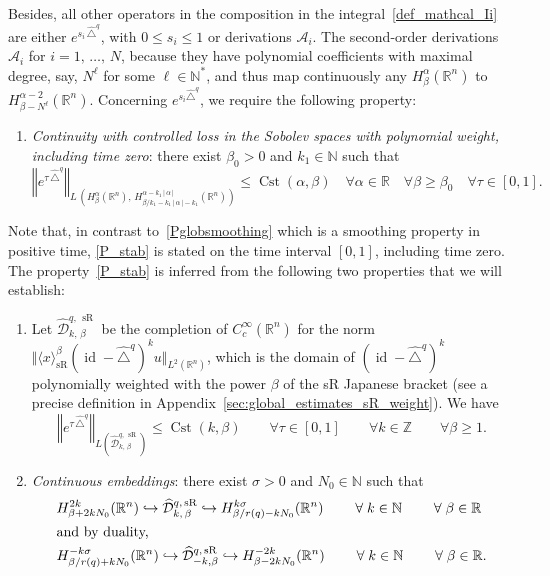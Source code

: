 \documentclass[10pt]{amsart}
\theoremstyle{definition}\newtheorem{defi}[theo]{Definition}\newtheorem{rema}[theo]{Remark}\newtheorem{exam}[theo]{Example}\newtheorem{exem}[theo]{Example}\newtheorem{nota}[theo]{Notation}
\newcommand*\R{\mathbb{R}}
\newcommand*\N{\mathbb{N}}
\newcommand*\Z{\mathbb{Z}}
\newcommand{\calA}{\mathcal{A}}
\newcommand{\calD}{\mathcal{D}}
\DeclareMathOperator{\Cst}{Cst}
\DeclareMathOperator{\id}{id}
\DeclareMathOperator{\sR}{sR}
\renewcommand{\geq}{\geqslant}
\renewcommand{\leq}{\leqslant}
\newcommand*{\Penumi}{\renewcommand*{\theenumi}{$\mathbf{P}_\arabic{enumi}$}}
\let\oldforall\forall
\renewcommand*{\forall}{\mathrel{\oldforall}}
\begin{document}
Besides, all other operators in the composition in the integral~\eqref{def_mathcal_Ii} are either $e^{s_i\,\widehat{\triangle}^{q}}$, with $0\leq s_i\leq 1$ or derivations $\calA_i$. The second-order derivations $\calA_i$ for $i=1,\,\ldots,\,N$, because they have polynomial coefficients with maximal degree, say, $N^\ell$ for some $\ell\in\N^*$, and thus map continuously any $H^\alpha_\beta(\R^n)$ to $H^{\alpha-2}_{\beta-N^\ell}(\R^n)$. Concerning $e^{s_i \widehat{\triangle}^{q}}$, we require the following property:
\begin{enumerate}\Penumi
\setcounter{enumi}{1}
\item\label{P_stab}
\emph{Continuity with controlled loss in the Sobolev spaces with polynomial weight, including time zero}: there exist $\beta_0>0$ and $k_1\in\N$ such that
\[
\left\Vert e^{\tau\,\widehat{\triangle}^{q}}\right\Vert_{L\,\left(H^\alpha_\beta\left(\R^n\right),\,H^{\alpha-k_1\,\vert\,\alpha\,\vert}_{\beta/k_1-k_1\,\vert\,\alpha\,\vert-k_1}\left(\R^n\right)\right)} \leq \Cst(\alpha,\beta) \quad
\forall \alpha\in\R\quad\forall\beta\geq\beta_0 \quad \forall\tau\in[0,1].
\]
\end{enumerate}
Note that, in contrast to~\eqref{Pglobsmoothing} which is a smoothing property in positive time, \eqref{P_stab} is stated on the time interval $[0,1]$, including time zero. The property~\eqref{P_stab} is inferred from the following two properties that we will establish:
\begin{enumerate}\Penumi
\setcounter{enumi}{2}
\item\label{P_semigroup} Let $\widehat{\calD}^{q,\,\sR}_{k,\,\beta}$ be the completion of $C_c^\infty(\R^n)$ for the norm $\Vert \langle x\rangle_{\sR}^\beta(\id - \widehat{\triangle}^{q})^k u\Vert_{L^2(\R^n)}$, which is the domain of $(\id - \widehat{\triangle}^{q})^k$ polynomially weighted with the power $\beta$ of the sR Japanese bracket (see a precise definition in Appendix~\ref{sec:global_estimates_sR_weight}). We have
\[
\left\Vert e^{\tau\,\widehat{\triangle}^{q}} \right\Vert_{L\left(\widehat{\calD}^{q,\,\sR}_{k,\,\beta}\right)} \leq \Cst(k,\beta) \qquad \forall \tau\in[0,1] \qquad \forall k\in\Z\qquad \forall \beta\geq 1.
\]

\item\label{P_contembed}
\emph{Continuous embeddings}: there exist $\sigma>0$ and $N_0\in\N$ such that
\begin{align*}
&H^{2k}_{\beta+2kN_0}(\R^n) \hookrightarrow \widehat{\calD}^{q,\,\sR}_{k,\,\beta} \hookrightarrow H^{k\sigma}_{\beta/r(q)-kN_0}(\R^n)
\qquad\forall k\in\N\qquad\forall\beta\in\R
\\
\intertext{and by duality,}
&H^{-k\sigma}_{\beta/r(q)+kN_0}(\R^n) \hookrightarrow \widehat{\calD}^{q,\,\sR}_{-k,\beta} \hookrightarrow H^{-2k}_{\beta-2kN_0}(\R^n)\qquad \forall k\in\N\qquad\forall\beta\in\R.
\end{align*}
\end{enumerate}
\end{document}
